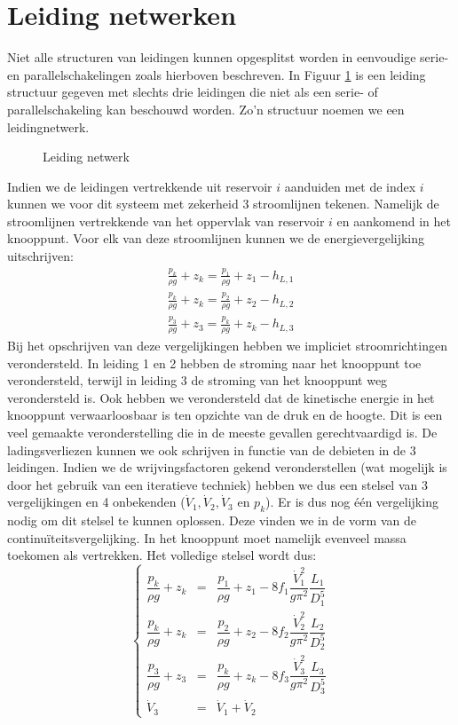 	\section{Leiding netwerken}
	\label{sec:Leiding netwerken}	
Niet alle structuren van leidingen kunnen opgesplitst worden in eenvoudige serie- en parallelschakelingen zoals hierboven beschreven. In Figuur \ref{fig:leidingnetwerk} is een leiding structuur gegeven met slechts drie leidingen die niet als een serie- of parallelschakeling kan beschouwd worden. Zo'n structuur noemen we een leidingnetwerk.
\begin{figure}
	\centering
	
	\caption{Leiding netwerk}
	\label{fig:leidingnetwerk}
\end{figure}
Indien we de leidingen vertrekkende uit reservoir $i$ aanduiden met de index $i$ kunnen we voor dit systeem met zekerheid 3 stroomlijnen tekenen. Namelijk de stroomlijnen vertrekkende van het oppervlak van reservoir $i$ en aankomend in het knooppunt. Voor elk van deze stroomlijnen kunnen we de energievergelijking uitschrijven:
\begin{eqnarray}
	\frac{p_k}{\rho g} + z_k = \frac{p_1}{\rho g} + z_1 - h_{L,1} \nonumber \\
	\frac{p_k}{\rho g} + z_k = \frac{p_2}{\rho g} + z_2 - h_{L,2} \\
	\frac{p_3}{\rho g} + z_3 = \frac{p_k}{\rho g} + z_k - h_{L,3} \nonumber
\end{eqnarray} 
Bij het opschrijven van deze vergelijkingen hebben we impliciet stroomrichtingen verondersteld. In leiding 1 en 2 hebben de stroming naar het knooppunt toe verondersteld, terwijl in leiding 3 de stroming van het knooppunt weg verondersteld is. Ook hebben we verondersteld dat de kinetische energie in het knooppunt verwaarloosbaar is ten opzichte van de druk en de hoogte. Dit is een veel gemaakte veronderstelling die in de meeste gevallen gerechtvaardigd is. De ladingsverliezen kunnen we ook schrijven in functie van de debieten in de 3 leidingen. Indien we de wrijvingsfactoren gekend veronderstellen (wat mogelijk is door het gebruik van een iteratieve techniek) hebben we dus een stelsel van 3 vergelijkingen en 4 onbekenden ($\dot{V}_1,\dot{V}_2,\dot{V}_3$ en $p_k$). Er is dus nog één vergelijking nodig om dit stelsel te kunnen oplossen. Deze vinden we in de vorm van de continuïteitsvergelijking. In het knooppunt moet namelijk evenveel massa toekomen als vertrekken. Het volledige stelsel wordt dus:
\begin{equation}
	\left\{
	\begin{array}{lcl}
		\dfrac{p_k}{\rho g} + z_k &=& \dfrac{p_1}{\rho g} + z_1 - 8 f_1 \dfrac{\dot{V}_1^2}{g \pi^2} \dfrac{L_1}{D_1^5} \\
		\dfrac{p_k}{\rho g} + z_k &=& \dfrac{p_2}{\rho g} + z_2 - 8 f_2 \dfrac{\dot{V}_2^2}{g \pi^2} \dfrac{L_2}{D_2^5} \\
		\dfrac{p_3}{\rho g} + z_3 &=& \dfrac{p_k}{\rho g} + z_k - 8 f_3 \dfrac{\dot{V}_3^2}{g \pi^2} \dfrac{L_3}{D_3^5} \\
		\dot{V}_3 &=& \dot{V}_1 + \dot{V}_2
	\end{array}
	\right.
	\label{eqn:3reservoirs stelsel}
\end{equation}

